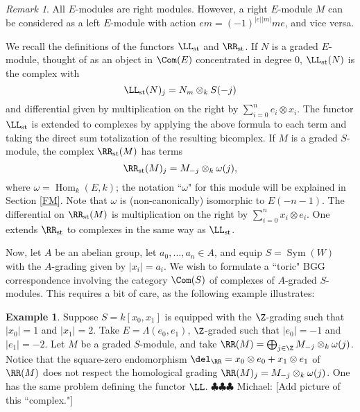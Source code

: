 \documentclass[12pt]{amsart}
\theoremstyle{definition}
\newtheorem{example}[lemma]{Example}
\theoremstyle{remark}
\newtheorem{rem}[lemma]{Remark}
\newcommand{\Hom}{\operatorname{Hom}} %
\newcommand{\Sym}{\operatorname{Sym}} %
\newcommand{\michael}[1]{{\color{red} \sf $\clubsuit\clubsuit\clubsuit$ Michael: [#1]}}
\def\on{\operatorname}
\def\om{\omega}
\def\om{\omega}
\begin{document}
\begin{rem}
All $E$-modules are right modules. However, a right $E$-module $M$ can be considered as a left $E$-module with action $em = (-1)^{|e||m|}me$, and vice versa.
\end{rem}

We recall the definitions of the functors $\LL_{\on{st}}$ and $\RR_{\on{st}}$. If $N$ is a graded $E$-module, thought of as an object in $\Com(E)$ concentrated in degree 0, $\LL_{\on{st}}(N)$ is the complex with
$$
\LL_{\on{st}}(N)_j = N_m \otimes_k S(-j)
$$
and differential given by multiplication on the right by $\sum_{i = 0}^n e_i \otimes x_i$. The functor $\LL_{\on{st}}$ is extended to complexes by applying the above formula to each term and taking the direct sum totalization of the resulting bicomplex. If $M$ is a graded $S$-module, the complex $\RR_{\on{st}}(M)$ has terms
$$
\RR_{\on{st}}(M)_j = M_{-j} \otimes_k \om(j), 
$$
where $\om = \Hom_k(E, k)$; the notation ``$\om$" for this module will be explained in Section \ref{FM}. Note that $\om$ is (non-canonically) isomorphic to $E(-n-1)$. The differential on $\RR_{\on{st}}(M)$ is multiplication on the right by $ \sum_{i = 0}^n x_i \otimes e_i$. One extends $\RR_{\on{st}}$ to complexes in the same way as $\LL_{\on{st}}$. 




Now, let $A$ be an abelian group, let $a_0, \dots, a_n \in A$, and equip $S = \Sym(W)$ with the $A$-grading given by $|x_i| = a_i$. We wish to formulate a ``toric" BGG correspondence involving the category $\Com(S)$ of complexes of $A$-graded $S$-modules. This requires a bit of care, as the following example illustrates:

\begin{example}
\label{grading}
Suppose $S = k[x_0, x_1]$ is equipped with the $\Z$-grading such that $|x_0| = 1$ and $|x_1| = 2$. Take $E= \Lambda(e_0, e_1)$, $\Z$-graded such that $|e_0| = -1$ and $|e_1| = -2$. Let $M$ be a graded $S$-module, and take $\RR(M) = \bigoplus_{j \in \Z} M_{-j} \otimes_k \om(j)$. Notice that the square-zero endomorphism $\del_{\RR} = x_0 \otimes e_0 + x_1 \otimes e_1$ of $\RR(M)$ does not respect the homological grading $\RR(M)_j = M_{-j} \otimes_k \om(j)$. One has the same problem defining the functor $\LL$. \michael{Add picture of this ``complex."}
\end{example}
\end{document}
